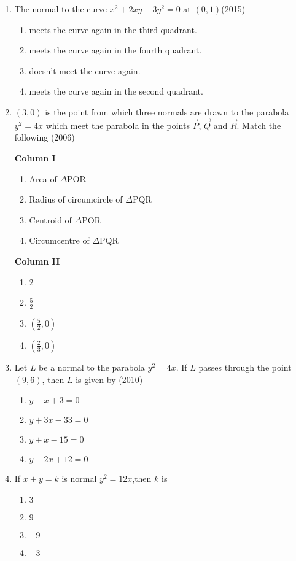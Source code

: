 \begin{enumerate}
\begin{multicols}{4}
\begin{enumerate}
			\item$\sqrt{3}$
		\end{enumerate}
\end{multicols}
\item The normal to the curve $x^2+2xy-3y^2=0$ at $(0,1)$\hfill(2015)
\begin{enumerate}
    \item meets the curve again in the third quadrant.
    \item meets the curve again in the fourth quadrant.
    \item doesn't meet the curve again.
    \item meets the curve again in the second quadrant.
\end{enumerate}
	\item    ${(3,0)}$ is the point from which three normals are drawn to the parabola $y^2 = 4x$ which meet the parabola in the points $\vec{P}$, $\vec{Q}$ and $\vec{R}$. Match the following \hfill{(2006)}
\begin{multicols}{2}
\textbf{Column I}
\begin{enumerate}
    \item Area of $\Delta$POR 
    \item Radius of circumcircle of $\Delta$PQR
    \item Centroid of $\Delta$POR 
    \item  Circumcentre of $\Delta$PQR 
\end{enumerate}

\textbf{Column II}
\begin{enumerate}
    \item 2
    \item $\frac{5}{2}$
    \item ${(\frac{5}{2},0)}$
    \item ${(\frac{2}{3},0)}$
\end{enumerate}
\end{multicols}
%
	\item Let $L$ be a normal to the parabola $y^2=4x$. If $L$ passes through the point $(9,6)$, then $L$ is given by 
		\hfill(2010)
		 \begin{multicols}{4}
\begin{enumerate}
			\item $y-x+3=0$
			\item $y+3x-33=0$
			\item $y+x-15=0$
			\item $y-2x+12=0$
		 \end{enumerate}
\end{multicols}
\item If $x+y=k$ is normal $y^2=12x$,then $k$ is
     \hfill{}
\begin{multicols}{4}
\begin{enumerate}
    \item $3$
    \item $9$
    \item $-9$
    \item $-3$
\end{enumerate}
\end{multicols}
\end{enumerate}
